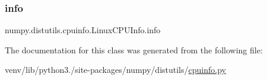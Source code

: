 \subsubsection{\texorpdfstring{info}{info}}
{\footnotesize\ttfamily numpy.\+distutils.\+cpuinfo.\+Linux\+C\+P\+U\+Info.\+info\hspace{0.3cm}{\ttfamily [static]}}



The documentation for this class was generated from the following file\+:\begin{DoxyCompactItemize}
\item 
venv/lib/python3./site-\/packages/numpy/distutils/\hyperlink{cpuinfo_8py}{cpuinfo.\+py}\end{DoxyCompactItemize}
